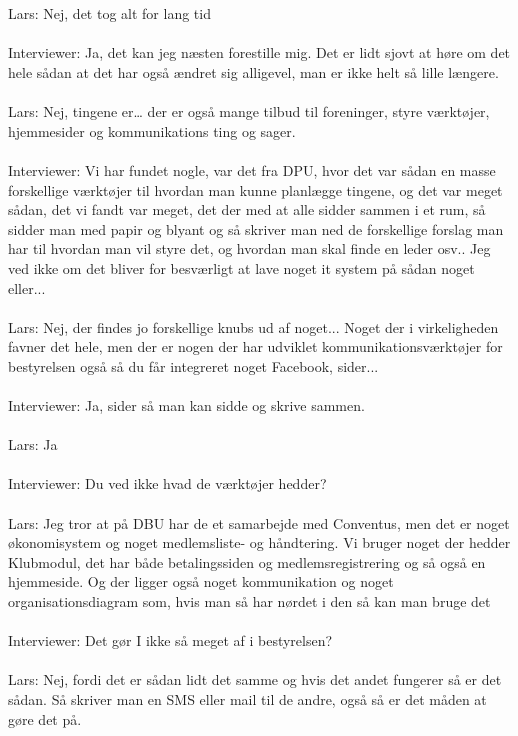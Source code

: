 \\\\
Lars: Nej, det tog alt for lang tid
\\\\
Interviewer: Ja, det kan jeg næsten forestille mig. Det er lidt sjovt at høre om det hele sådan at det har også ændret sig alligevel, man er ikke helt så lille længere.
\\\\
Lars: Nej, tingene er… der er også mange tilbud til foreninger, styre værktøjer, hjemmesider og kommunikations ting og sager.
\\\\
Interviewer: Vi har fundet nogle, var det fra DPU, hvor det var sådan en masse forskellige værktøjer til hvordan man kunne planlægge tingene, og det var meget sådan, det vi fandt var meget, det der med at alle sidder sammen i et rum, så sidder man med papir og blyant og så skriver man ned de forskellige forslag man har til hvordan man vil styre det, og hvordan man skal finde en leder osv.. Jeg ved ikke om det bliver for besværligt at lave noget it system på sådan noget eller...       
\\\\
Lars: Nej, der findes jo forskellige knubs ud af noget... Noget der i virkeligheden favner det hele, men der er nogen der har udviklet kommunikationsværktøjer for bestyrelsen også så du får integreret noget Facebook, sider...
\\\\
Interviewer: Ja, sider så man kan sidde og skrive sammen.
\\\\
Lars: Ja
\\\\
Interviewer: Du ved ikke hvad de værktøjer hedder?
\\\\
Lars: Jeg tror at på DBU har de et samarbejde med Conventus, men det er noget økonomisystem og noget medlemsliste- og håndtering. Vi bruger noget der hedder Klubmodul, det har både betalingssiden og medlemsregistrering og så også en hjemmeside. Og der ligger også noget kommunikation og noget organisationsdiagram som, hvis man så har nørdet i den så kan man bruge det
\\\\
Interviewer: Det gør I ikke så meget af i bestyrelsen?
\\\\
Lars: Nej, fordi det er sådan lidt det samme og hvis det andet fungerer så er det sådan. Så skriver man en SMS eller mail til de andre, også så er det måden at gøre det på.
\\\\



